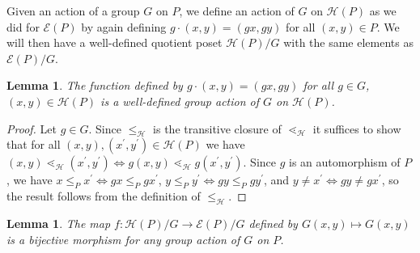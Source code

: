 \documentclass[10 pt]{amsart}
\theoremstyle{plain}
\newtheorem{lem}[thm]{Lemma}
\theoremstyle{definition}
\theoremstyle{remark}
\numberwithin{equation}{section}
\renewcommand{\iff}{\Leftrightarrow}
\begin{document}
Given an action of a group $G$ on $P$, we define an action of $G$ on $\mathcal{H}(P)$ as we did for $\mathcal{E}(P)$ by again defining $g\cdot (x,y) = (gx,gy)$ for all $(x,y)\in P$.  We will then have a well-defined quotient poset $\mathcal{H}(P)/G$ with the same elements as $\mathcal{E}(P)/G$.


\begin{lem}
\label{lem:G_action_on_HP}
The function defined by $g\cdot (x, y)= (gx, gy)$ for all $g\in G$, $(x, y)\in \mathcal{H}(P)$ is a well-defined group action of $G$ on $\mathcal{H}(P)$.
\end{lem}

\begin{proof}
Let $g\in G$.  Since $\le_{\mathcal{H}}$ is the transitive closure of $\lessdot_{\mathcal{H}}$ it suffices to show that for all $(x,y),(x^\prime,y^\prime)\in \mathcal{H}(P)$ we have $(x, y) \lessdot_{\mathcal H} (x^\prime,y^\prime) \iff g(x, y) \lessdot_{\mathcal H} g(x^\prime, y^\prime)$.  Since $g$ is an automorphism of $P$, we have $x\le_P x^\prime \iff gx\le_P gx^\prime$, $y\le_P y^\prime \iff gy\le_P gy^\prime$, and $y\neq x^\prime \iff gy\neq gx^\prime$, so the result follows from the definition of $\le_{\mathcal{H}}$.
\end{proof}







\begin{lem}
\label{lem:bijection_h_f}
The map $f:\mathcal H(P)/G \rightarrow \mathcal E(P)/G$ defined by $G(x,y) \mapsto G(x,y)$ is a bijective morphism for any group action of $G$ on $P$.
\end{lem}
\end{document}
